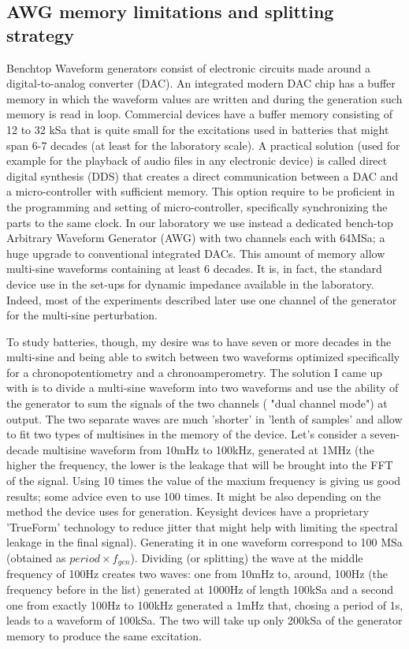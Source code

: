 \subsection{AWG memory limitations and splitting strategy}
\label{sec:multisine split}
Benchtop Waveform generators consist of electronic circuits made around a digital-to-analog converter (DAC).
An integrated modern DAC chip has a buffer memory in which the waveform values are written and during the generation such memory is read in loop.  
Commercial devices have a buffer memory consisting of 12 to 32 kSa that is quite small for the excitations used in batteries that might span 6-7 decades (at least for the laboratory scale). 
A practical solution (used for example for the playback of audio files in any electronic device) is called direct digital synthesis (DDS) that creates a direct communication between a DAC and a micro-controller with sufficient memory. 
This option require to be proficient in the programming and setting of micro-controller, specifically synchronizing the parts to the same clock. 
In our laboratory we use instead a dedicated bench-top Arbitrary Waveform Generator (AWG) with two channels each with 64MSa; a huge upgrade to conventional integrated DACs. 
This amount of memory allow multi-sine waveforms containing at least 6 decades. 
It is, in fact, the standard device use in the set-ups for dynamic impedance available in the laboratory.
 Indeed, most of the experiments described later use one channel of the generator for the multi-sine perturbation. 

To study batteries, though, my desire was to have seven or more decades in the multi-sine and being able to switch between two waveforms optimized specifically for a chronopotentiometry and a chronoamperometry. 
The solution I came up with is to divide a multi-sine waveform into two waveforms and use the ability of the generator to sum the signals of the two channels ( "dual channel mode") at output.  
The two separate waves are much 'shorter' in  'lenth of samples' and allow to fit two types of multisines in the memory of the device. 
Let's consider a seven-decade multisine waveform from 10mHz to 100kHz, generated at 1MHz (the higher the frequency, the lower is the leakage that will be brought into the FFT of the signal. 
Using 10 times the value of the maxium frequency is giving us good results; some advice even to use 100 times. 
It might be also depending on the method the device uses for generation. 
Keysight devices have a proprietary 'TrueForm' technology to reduce jitter that might help with limiting the spectral leakage in the final signal).  
Generating it in one waveform correspond to 100 MSa (obtained as $period \times f_{gen}$). 
Dividing (or splitting) the wave at the middle frequency of 100Hz creates two waves: one from 10mHz to, around, 100Hz (the frequency before in the list) generated at 1000Hz of length 100kSa and a second one from exactly 100Hz to 100kHz generated a 1mHz that, chosing a period of 1s, leads to a waveform of 100kSa. 
The two will take up only 200kSa of the generator memory to produce the same excitation.

